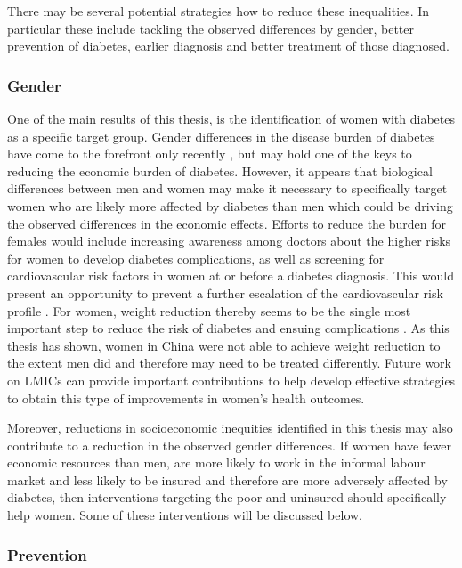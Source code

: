 There may be several potential strategies how to reduce these inequalities. In particular these include tackling the observed differences by gender, better prevention of diabetes, earlier diagnosis and better treatment of those diagnosed.

\subsubsection{Gender}

One of the main results of this thesis, is the identification of women with diabetes as a specific target group. Gender differences in the disease burden of diabetes have come to the forefront only recently \parencite{Peters2015}, but may hold one of the keys to reducing the economic burden of diabetes. However, it appears that biological differences between men and women may make it necessary to specifically target women who are likely more affected by diabetes than men \parencite{Peters2015,Peters2014a,Peters2014,Bertram2010} which could be driving the observed differences in the economic effects. Efforts to reduce the burden for females would include increasing awareness among doctors about the higher risks for women to develop diabetes complications, as well as screening for cardiovascular risk factors in women at or before a diabetes diagnosis. This would present an opportunity to prevent a further escalation of the cardiovascular risk profile \parencite{Peters2015}. For women, weight reduction thereby seems to be the single most important step to reduce the risk of diabetes and ensuing complications \parencite{Peters2015}. As this thesis has shown, women in China were not able to achieve weight reduction to the extent men did and therefore may need to be treated differently. Future work on \acp{LMIC} can provide important contributions to help develop effective strategies to obtain this type of improvements in women's health outcomes.

Moreover, reductions in socioeconomic inequities identified in this thesis may also contribute to a reduction in the observed gender differences. If women have fewer economic resources than men, are more likely to work in the informal labour market and less likely to be insured \parencite{Galli2008} and therefore are more adversely affected by diabetes, then interventions targeting the poor and uninsured should specifically help women. Some of these interventions will be discussed below.

\subsubsection{Prevention}

